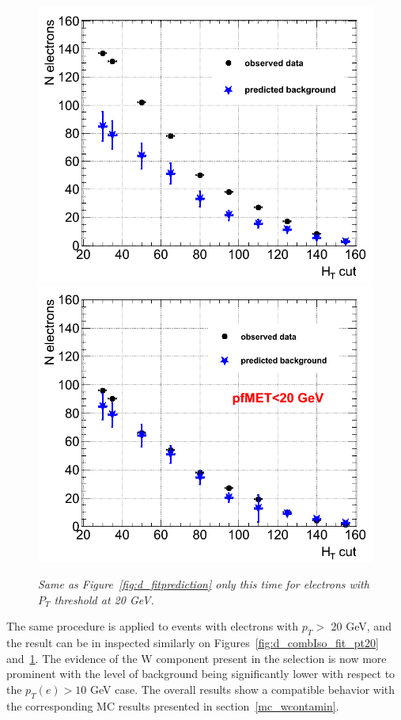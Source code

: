 \begin{figure}[h!]
\centering
\includegraphics[scale=0.32]{Plots/d_fitprediction_pt20_vsHT.png}
\includegraphics[scale=0.32]{Plots/d_fitprediction_pt20_METanticut_vsHT.png}
\caption{\textit{Same as Figure~\ref{fig:d_fitprediction} only this time for electrons with $P_{T}$ threshold at 20 GeV. }}
\label{fig:d_fitprediction_pt20}
\end{figure}

The same procedure is applied to events with electrons with $p_{T} >$ 20 GeV, and the result can be in inspected similarly on Figures~\ref{fig:d_combIso_fit_pt20} and~\ref{fig:d_fitprediction_pt20}. The evidence of the W component present in the selection is now more prominent with the level of background being significantly lower with respect to the $p_{T}(e)>10 $ GeV case. The overall results show a compatible behavior with the corresponding MC results presented in section~\ref{mc_wcontamin}.

